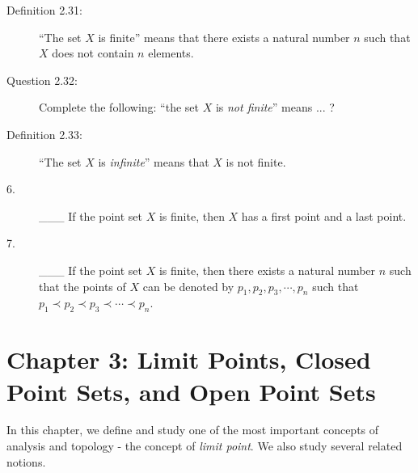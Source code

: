 \documentclass{book}
\begin{document}
\begin{description}
\item[Definition 2.31:] ``The set $X$ is finite'' means that there exists a natural number $n$ such that $X$ does not contain $n$ elements.

\item[Question 2.32:] Complete the following: ``the set $X$ is \emph{not finite}'' means ... ?

\item[Definition 2.33:] ``The set $X$ is \emph{infinite}'' means that $X$ is not finite.

\item[6.] \_\_\_ If the point set $X$ is finite, then $X$ has a first point and a last point.

\item[7.] \_\_\_ If the point set $X$ is finite, then there exists a natural number $n$ such that the points of $X$ can be denoted by $p_{1}, p_{2}, p_{3}, \cdots , p_{n}$ such that $p_{1}  \prec p_{2} \prec p_{3} \prec \cdots \prec p_{n}$.

\end{description}




\chapter*{Chapter 3: Limit Points, Closed Point Sets, and Open Point Sets}


In this chapter, we define and study one of the most important concepts of analysis and topology - the concept of \emph{limit point}. We also study several related notions.
\end{document}
